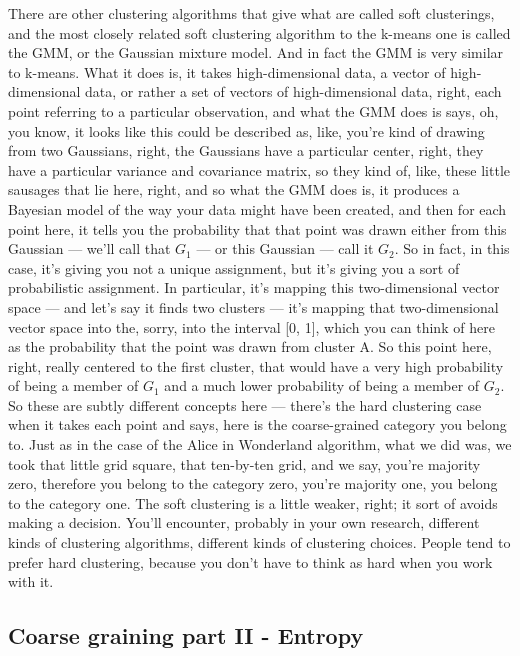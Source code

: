\documentclass[]{article}
\begin{document}
There are other clustering algorithms
that give what are called soft clusterings,
and the most closely related
soft clustering algorithm to the
k-means one is called the GMM,
or the Gaussian mixture model.
And in fact the GMM is very similar
to k-means. What it does is, it takes
high-dimensional data, a vector of
high-dimensional data, or rather a set
of vectors of high-dimensional data,
right, each point referring to
a particular observation, and what the GMM
does is says, oh, you know, it looks like
this could be described as, like,
you're kind of drawing from two
Gaussians, right, the Gaussians
have a particular center, right,
they have a particular variance
and covariance matrix,
so they kind of, like,
these little sausages that lie here,
right,  and so what the GMM does is,
it produces a Bayesian model
of the way your data might have been
created,  and then for each point here,
it tells you the probability that that point
was drawn either from this Gaussian ---
we'll call that $G_1$ --- or this
Gaussian --- call it $G_2$.
So in fact, in this case, it's giving you
not a unique assignment, but it's
giving you a sort of probabilistic
assignment. In particular, it's mapping
this two-dimensional vector space ---
and let's say it finds two clusters ---
it's mapping that two-dimensional
vector space into the, sorry,
into the interval [0, 1], which you can
think of here as the probability
that the point was drawn from cluster A.
So this point here, right, really centered
to the first cluster, that would have a
very high probability of being a member
of $G_1$ and a much lower probability of
being a member of $G_2$.
So these are subtly different concepts
here --- there's the hard clustering case
when it takes each point and says, 
here is the coarse-grained category
you belong to. Just as in the case of the
Alice in Wonderland algorithm, what
we did was, we took that little
grid square, that ten-by-ten grid,
and we say,  you're majority zero,
therefore you belong to
the category zero, you're majority one,
you belong to the category one.
The soft clustering is a little weaker,
right; it sort of avoids
making a decision. You'll encounter,
probably in your own research,
different kinds of clustering algorithms,
different kinds of clustering choices.
People tend to prefer hard clustering,
because you don't have to think as hard
when you work with it.

\subsection{Coarse graining part II - Entropy}
\end{document}

